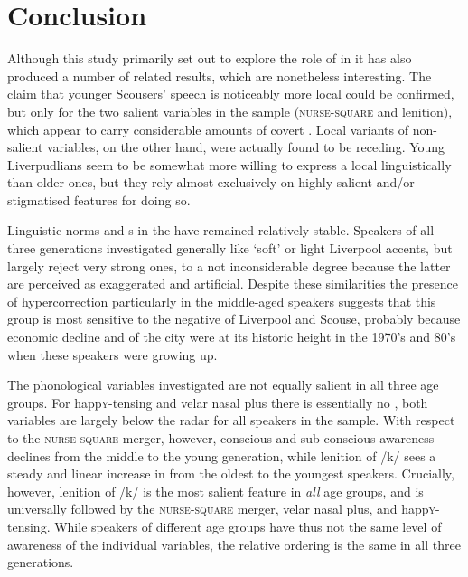\chapter{Conclusion}
\label{ch.conclusion}

Although this study primarily set out to explore the role of  in   it has also produced a number of related results, which are nonetheless interesting.
The claim that younger Scousers' speech is noticeably more local \parencite[cf.][]{watson2007a} could be confirmed, but only for the two salient variables in the sample (\textsc{nurse}-\textsc{square} and lenition), which appear to carry considerable amounts of covert .
Local variants of non-salient variables, on the other hand, were actually found to be receding.
Young Liverpudlians seem to be somewhat more willing to express a local  linguistically than older ones, but they rely almost exclusively on highly salient and/or stigmatised features for doing so.

Linguistic norms and s in the  have remained relatively stable.
Speakers of all three generations investigated generally like `soft' or light Liverpool accents, but largely reject very strong ones, to a not inconsiderable degree because the latter are perceived as exaggerated and artificial.
Despite these similarities the presence of hypercorrection particularly in the middle-aged speakers suggests that this group is most sensitive to the negative  of Liverpool and Scouse, probably because economic decline and  of the city were at its historic height in the 1970's and 80's when these speakers were growing up.

The phonological variables investigated are not equally salient in all three age groups.
For happ\textsc{y}-tensing and velar nasal plus there is essentially no , both variables are largely below the radar for all speakers in the sample.
With respect to the \textsc{nurse}-\textsc{square} merger, however, conscious and sub-conscious awareness declines from the middle to the young generation, while lenition of /k/ sees a steady and linear increase in  from the oldest to the youngest speakers.
Crucially, however, lenition of /k/ is the most salient feature in \emph{all} age groups, and is universally followed by the \textsc{nurse}-\textsc{square} merger, velar nasal plus, and happ\textsc{y}-tensing.
While speakers of different age groups have thus not the same level of awareness of the individual variables, the relative ordering is the same in all three generations.

